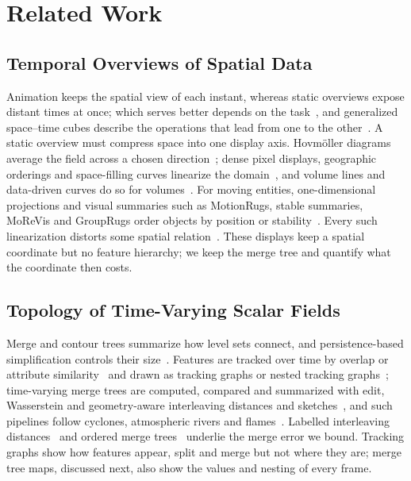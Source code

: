\section{Related Work}\label{sec:related}
\subsection{Temporal Overviews of Spatial Data}
Animation keeps the spatial view of each instant, whereas static overviews expose distant times at once; which serves better depends on the task~\cite{Tversky:2002:Animation,Robertson:2008:Animation,Archambault:2011:AMM}, and generalized space--time cubes describe the operations that lead from one to the other~\cite{Bach:2017:STC}. A static overview must compress space into one display axis. Hovm\"oller diagrams average the field across a chosen direction~\cite{Hovmoller:1949}; dense pixel displays, geographic orderings and space-filling curves linearize the domain~\cite{Keim:2000:PIX,Guo:2006:SpatialOrder,Dafner:2000:CSFC,Rauscher:2025:1DO,Rauscher:2026:VB}, and volume lines and data-driven curves do so for volumes~\cite{Weissenboeck:2019:DVL,Zhou:2021:DSF}. For moving entities, one-dimensional projections and visual summaries such as MotionRugs, stable summaries, MoReVis and GroupRugs order objects by position or stability~\cite{Franke:2021:1DP,Buchmueller:2019:MR,Wulms:2021:SVS,Valdrighi:2024:MRV,Stolk:2025:GR}. Every such linearization distorts some spatial relation~\cite{Nonato:2019:MP,Aupetit:2007:VD,Nguyen:2013:FGV}. These displays keep a spatial coordinate but no feature hierarchy; we keep the merge tree and quantify what the coordinate then costs.

\subsection{Topology of Time-Varying Scalar Fields}
Merge and contour trees summarize how level sets connect, and persistence-based simplification controls their size~\cite{Heine:2016:Survey,Edelsbrunner:2002:TPS,Carr:2004:SFI,Tierny:2012:GTS,Tierny:2018:TTK}. Features are tracked over time by overlap or attribute similarity~\cite{Samtaney:1994:Tracking,Silver:1997:Tracking,Saikia:2017:GFT} and drawn as tracking graphs or nested tracking graphs~\cite{Widanagamaachchi:2012:DTG,Lukasczyk:2017:NTG,Lukasczyk:2020:DNTG}; time-varying merge trees are computed, compared and summarized with edit, Wasserstein and geometry-aware interleaving distances and sketches~\cite{Oesterling:2017:TVMT,Wetzels:2022:BDI,Pont:2022:WMT,Yan:2022:GAMT,Li:2023:SMT,Yan:2021:Survey}, and such pipelines follow cyclones, atmospheric rivers and flames~\cite{Yan:2024:TROPHY,Lan:2024:AR,Bremer:2010:Burning}. Labelled interleaving distances~\cite{Munch:2019:LINF,Gasparovic:2024:IID,Morozov:2013:IDMT} and ordered merge trees~\cite{Beurskens:2025:OMT,Beurskens:2025:ParkView} underlie the merge error we bound. Tracking graphs show how features appear, split and merge but not where they are; merge tree maps, discussed next, also show the values and nesting of every frame.

